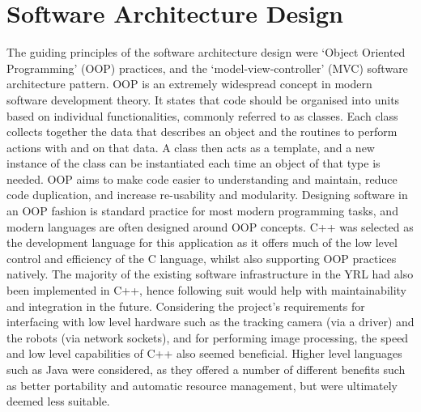 \section{Software Architecture Design}
The guiding principles of the software architecture design were `Object Oriented Programming' (OOP) practices, and the `model-view-controller' (MVC) software architecture pattern. OOP \cite{OOP} is an extremely widespread concept in modern software development theory. It states that code should be organised into units based on individual functionalities, commonly referred to as classes. Each class collects together the data that describes an object and the routines to perform actions with and on that data. A class then acts as a template, and a new instance of the class can be instantiated each time an object of that type is needed. OOP aims to make code easier to understanding and maintain, reduce code duplication, and increase re-usability and modularity. Designing software in an OOP fashion is standard practice for most modern programming tasks, and modern languages are often designed around OOP concepts. C++ was selected as the development language for this application as it offers much of the low level control and efficiency of the C language, whilst also supporting OOP practices natively. The majority of the existing software infrastructure in the YRL had also been implemented in C++, hence following suit would help with maintainability and integration in the future. Considering the project's requirements for interfacing with low level hardware such as the tracking camera (via a driver) and the robots (via network sockets), and for performing image processing, the speed and low level capabilities of C++ also seemed beneficial. Higher level languages such as Java were considered, as they offered a number of different benefits such as better portability and automatic resource management, but were ultimately deemed less suitable.

